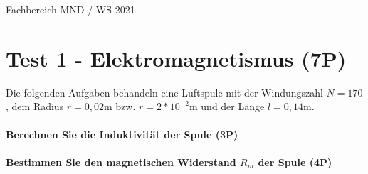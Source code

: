 \documentclass{article}
\begin{document}
Fachbereich MND / WS 2021


\part*{Test 1 - Elektromagnetismus (7P)}

Die folgenden Aufgaben behandeln eine Luftspule mit der Windungszahl $N=170$, dem Radius $r=0{,}02$m bzw. $r=2*10^{ -2 }$m und der Länge $l=0{,}14$m.

\subsection*{Berechnen Sie die Induktivität der Spule (3P)}


\vspace{\baselineskip}\vspace{\baselineskip}\vspace{\baselineskip}

\subsection*{Bestimmen Sie den magnetischen Widerstand $R_{m}$ der Spule (4P)}


\vspace{\baselineskip}
\end{document}

